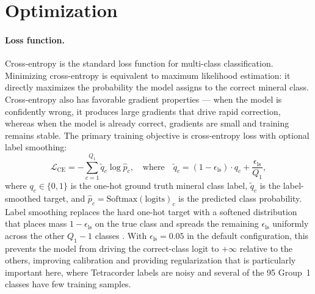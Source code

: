 \documentclass[11pt]{report}
\begin{document}
\section{Optimization}
\label{sec:optimization}

\paragraph{Loss function.}
Cross-entropy is the standard loss function for multi-class classification. Minimizing cross-entropy is equivalent to maximum likelihood estimation: it directly maximizes the probability the model assigns to the correct mineral class. Cross-entropy also has favorable gradient properties --- when the model is confidently wrong, it produces large gradients that drive rapid correction, whereas when the model is already correct, gradients are small and training remains stable. The primary training objective is cross-entropy loss with optional label smoothing:
\begin{equation}
\mathcal{L}_{\text{CE}} = -\sum_{c=1}^{Q_1} \tilde{q}_c \log \hat{p}_c, \quad \text{where} \quad \tilde{q}_c = (1 - \epsilon_{\text{ls}}) \cdot q_c + \frac{\epsilon_{\text{ls}}}{Q_1},
\label{eq:ce_loss}
\end{equation}
where $q_c \in \{0,1\}$ is the one-hot ground truth mineral class label, $\tilde{q}_c$ is the label-smoothed target, and $\hat{p}_c = \text{Softmax}(\text{logits})_c$ is the predicted class probability. Label smoothing replaces the hard one-hot target with a softened distribution that places mass $1 - \epsilon_{\text{ls}}$ on the true class and spreads the remaining $\epsilon_{\text{ls}}$ uniformly across the other $Q_1 - 1$ classes \cite{szegedy2016rethinking}. With $\epsilon_{\text{ls}} = 0.05$ in the default configuration, this prevents the model from driving the correct-class logit to $+\infty$ relative to the others, improving calibration and providing regularization that is particularly important here, where Tetracorder labels are noisy and several of the 95 Group~1 classes have few training samples.
\end{document}
